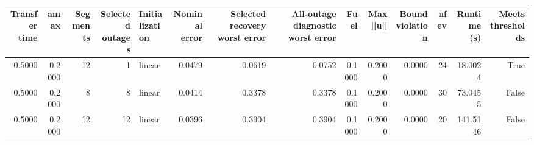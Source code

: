 \begin{tabular}{rrrrlrrrrrrrrr}
\toprule
Transfer time & amax & Segments & Selected outages & Initialization & Nominal error & Selected recovery worst error & All-outage diagnostic worst error & Fuel & Max ||u|| & Bound violation & nfev & Runtime (s) & Meets thresholds \\
\midrule
0.5000 & 0.2000 & 12 & 1 & linear & 0.0479 & 0.0619 & 0.0752 & 0.1000 & 0.2000 & 0.0000 & 24 & 18.0024 & True \\
0.5000 & 0.2000 & 8 & 8 & linear & 0.0414 & 0.3378 & 0.3378 & 0.1000 & 0.2000 & 0.0000 & 30 & 73.0455 & False \\
0.5000 & 0.2000 & 12 & 12 & linear & 0.0396 & 0.3904 & 0.3904 & 0.1000 & 0.2000 & 0.0000 & 20 & 141.5146 & False \\
\bottomrule
\end{tabular}
